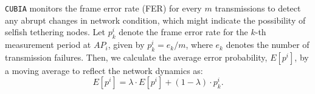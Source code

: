 %
%
%

%
%
%
%
%

{\tt CUBIA} monitors the frame error rate (FER) for every $m$ transmissions
to detect any abrupt changes in network condition, which might indicate
the possibility of selfish tethering nodes.
%
Let $p_{k}^{i}$ denote the frame error rate for the $k$-th measurement
period at $AP_i$, given by $p_{k}^{i} = e_{k}/m$, where $e_{k}$ denotes
the number of transmission failures. Then, we calculate the average
error probability, $E[p^{i}]$, by a moving average to reflect the
network dynamics as:
%
\begin{equation} \label{Eq:move_avg}
E[p^{i}] = \lambda \cdot E[p^{i}]  + (1 - \lambda) \cdot p_{k}^{i}.
\end{equation}


